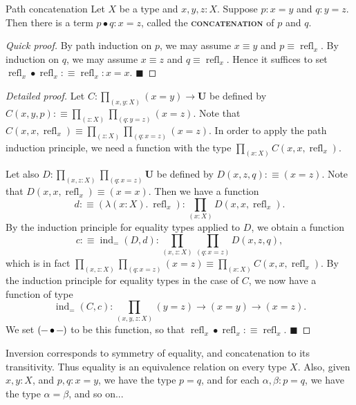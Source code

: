 \documentclass{article}
\newcommand{\defn}[1]{{\scshape\bfseries\color{MPBemph}#1}}
\renewcommand{\qed}{\hfill{\color{MPBthm}\( \blacksquare \)}}
\newcommand{\eql}{\mathbin{:\equiv}}
\newcommand{\U}{\mathbf{U}}
\newcommand{\tpi}[1]{\prod_{(#1)}}
\DeclareMathOperator{\ind}{ind}
\newcommand{\1}{\textbf{1}}
\newcommand{\0}{\mathbf{0}}
\newcommand{\2}{\textbf{2}}
\DeclareMathOperator{\refl}{refl}
\newcommand{\dash}{\rule[0.5ex]{1.5ex}{0.4pt}}
\begin{document}
\begin{thm}{Path concatenation}{} Let \( X \) be a type and \( x, y, z : X \). Suppose \( p : x = y \) and \( q : y = z \). Then there is a term \( p \bullet q : x = z \), called the \defn{concatenation} of \( p \) and \( q \).
\begin{proof}[Quick proof]
	By path induction on \( p \), we may assume \( x \equiv y \) and \( p \equiv \refl_{x} \). By induction on \( q \), we may assume \( x \equiv z \) and \( q \equiv \refl_{x} \). Hence it suffices to set \( \refl_{x} \bullet \refl_{x} \eql \refl_{x} : x = x \). \qed
\end{proof}
\begin{proof}[Detailed proof]
	Let \( C : \tpi{x, y : X} (x = y) \to \U \) be defined by \( C(x, y, p) \eql \tpi{z : X} \tpi{q : y = z} (x = z) \). Note that \( C(x, x, \refl_{x}) \equiv \tpi{z : X} \tpi{q : x = z} (x = z) \). In order to apply the path induction principle, we need a function with the type \( \tpi{x : X} C(x, x, \refl_{x}) \).
	
	Let also \( D : \tpi{x, z : X} \tpi{q : x = z} \U \) be defined by \( D(x, z, q) \eql (x = z) \). Note that \( D(x, x, \refl_{x}) \equiv (x = x) \). Then we have a function
	\[ d \eql (\lambda(x : X).~\refl_{x}) : \tpi{x : X} D(x, x, \refl_{x}). \]
	By the induction principle for equality types applied to \( D \), we obtain a function
	\[ c \eql \ind_{=}(D, d) : \tpi{x, z : X} \tpi{q : x = z} D(x, z, q), \]
	which is in fact \( \tpi{x, z : X} \tpi{q : x = z} (x = z) \equiv \tpi{x : X} C(x, x, \refl_{x}) \).
	By the induction principle for equality types in the case of \( C \), we now have a function of type
	\[ \ind_{=}(C, c) : \tpi{x, y, z : X} (y = z) \to (x = y) \to (x = z). \]
	We set \( (\dash \bullet \dash) \) to be this function, so that \( \refl_{x} \bullet \refl_{x} \eql \refl_{x} \). \qed
\end{proof} \end{thm}
Inversion corresponds to symmetry of equality, and concatenation to its transitivity. Thus equality is an equivalence relation on every type \( X \). Also, given \( x, y : X \), and \( p, q : x = y \), we have the type \( p = q \), and for each \( \alpha, \beta : p = q \), we have the type \( \alpha = \beta \), and so on...
\end{document}
